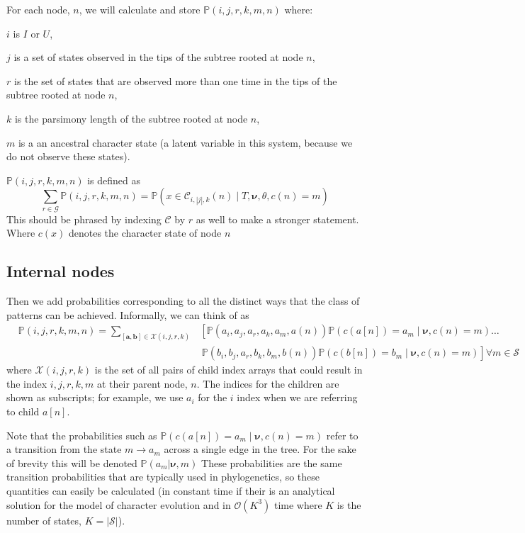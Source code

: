\documentclass[11pt]{article}
\newcommand{\inform}{\ensuremath{I}\xspace}
\newcommand{\uninform}{\ensuremath{U}\xspace}
\newcommand{\allStates}{\ensuremath{\mathcal S}\xspace}
\newcommand{\allStateSets}{\ensuremath{\mathcal G}\xspace}
\newcommand{\comboSet}{\ensuremath{\mathcal X}\xspace}
\newcommand{\edgeLengths}{\ensuremath{\bm \nu}\xspace}
\newcommand{\patProbSym}{\ensuremath{\mathbb P}\xspace}
\renewcommand{\Pr}{\patProbSym}
\newcommand{\patProb}[6]{\ensuremath{\patProbSym\left(#1,#2,#3,#4,#5,#6\right)}\xspace}
\newcommand{\patClassSym}{\ensuremath{\mathcal C}\xspace}
\newcommand{\patClass}[3]{\ensuremath{\patClassSym_{#1,#2,#3}}\xspace}
\newcommand{\stateOf}[1]{\ensuremath{c\left(#1\right)}\xspace}
\newcommand{\leftChild}[1]{\ensuremath{a\left[#1\right]}\xspace} %
\newcommand{\rightChild}[1]{\ensuremath{b\left[#1\right]}\xspace}%
\newcommand{\order}{{\mathcal{O}}}
\newcommand{\mthNote}[1]{{\color{red}#1}\\}
\begin{document}
For each node, $n$, we will calculate and store \patProb{i}{j}{r}{k}{m}{n} where:
\begin{compactitem}
	\item $i$ is \inform  or \uninform,
	\item $j$ is a set of states observed in the tips of the subtree rooted at node $n$,
	\item $r$ is the set of states that are observed more than one time in the tips of the subtree rooted at node $n$,
	\item $k$ is the parsimony length of the subtree rooted at node $n$,
	\item $m$ is a an ancestral character state (a latent variable in this system, because we do not observe these states).
\end{compactitem}
\patProb{i}{j}{r}{k}{m}{n} is defined as
\begin{equation}
	\sum_{r\in\allStateSets}\patProb{i}{j}{r}{k}{m}{n} = \Pr\left(x\in\patClass{i}{|j|}{k}(n) \mid T, \edgeLengths, \theta, \stateOf{n}=m\right)
\end{equation}
\mthNote{This should be phrased by indexing $\patClassSym$ by $r$ as well to make a stronger statement.}
Where \stateOf{x} denotes the character state of node $n$



\subsection{Internal nodes}
Then we add probabilities corresponding to all the distinct ways that the class of patterns can be achieved.
Informally, we can think of  as
\begin{eqnarray*}
	&\patProb{i}{j}{r}{k}{m}{n} =  \sum_{[{\bm a}, {\bm b}]\in\comboSet(i, j, r, k)} & \left[\patProb{a_i}{a_j}{a_r}{a_k}{a_m}{a(n)}\Pr(\stateOf{\leftChild{n}}=a_m \mid \edgeLengths,\stateOf{n}=m)\ldots\right. \\
	 & & \,\left.\patProb{b_i}{b_j}{a_r}{b_k}{b_m}{b(n)}\Pr(\stateOf{\rightChild{n}}=b_m \mid \edgeLengths, \stateOf{n}=m)\right] \forall m \in\allStates
\end{eqnarray*}
where $\comboSet(i, j, r, k)$ is the set of all pairs of child index arrays that could result in the index $i,j,r,k,m$ at their parent node, $n$.
The indices for the children are shown as subscripts; for example, we use $a_i$ for the $i$ index when we are referring to child \leftChild{n}.

Note that the probabilities such as $\Pr(\stateOf{\leftChild{n}}=a_m \mid \edgeLengths,\stateOf{n}=m)$ refer to a transition from the state $m\rightarrow a_m$ across a single edge in the tree. For the sake of brevity this will be denoted $\Pr(a_m|\edgeLengths, m)$
These probabilities are the same transition probabilities that are typically used in phylogenetics, so these quantities can easily be calculated (in constant time if their is an analytical solution for the model of character evolution and in $\order(K^3)$ time where $K$ is the number of states, $K=|\allStates|$).
\end{document}
